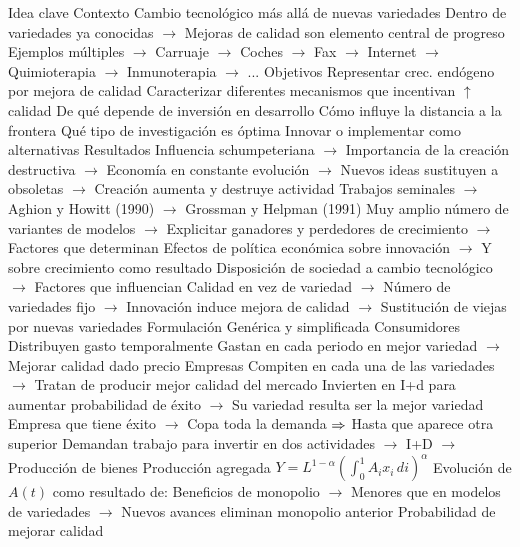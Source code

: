 \documentclass{nuevotema}
\begin{document}
\begin{esquemal}
			\3 Idea clave
				\4 Contexto
				\4[] Cambio tecnológico más allá de nuevas variedades
				\4[] Dentro de variedades ya conocidas
				\4[] $\to$ Mejoras de calidad son elemento central de progreso
				\4[] Ejemplos múltiples
				\4[] $\to$ Carruaje $\to$ Coches
				\4[] $\to$ Fax $\to$ Internet
				\4[] $\to$ Quimioterapia $\to$ Inmunoterapia
				\4[] $\to$ ...
				\4 Objetivos
				\4[] Representar crec. endógeno por mejora de calidad
				\4[] Caracterizar diferentes mecanismos que incentivan $\uparrow$ calidad
				\4[] De qué depende de inversión en desarrollo
				\4[] Cómo influye la distancia a la frontera
				\4[] Qué tipo de investigación es óptima
				\4[] Innovar o implementar como alternativas
				\4 Resultados
				\4[] Influencia schumpeteriana
				\4[] $\to$ Importancia de la creación destructiva
				\4[] $\to$ Economía en constante evolución
				\4[] $\to$ Nuevos ideas sustituyen a obsoletas
				\4[] $\to$ Creación aumenta y destruye actividad
				\4[] Trabajos seminales
				\4[] $\to$ Aghion y Howitt (1990)
				\4[] $\to$ Grossman y Helpman (1991)
				\4[] Muy amplio número de variantes de modelos
				\4[] $\to$ Explicitar ganadores y perdedores de crecimiento
				\4[] $\to$ Factores que determinan
				\4[] Efectos de política económica sobre innovación
				\4[] $\to$ Y sobre crecimiento como resultado
				\4[] Disposición de sociedad a cambio tecnológico
				\4[] $\to$ Factores que influencian
				\4[] Calidad en vez de variedad
				\4[] $\to$ Número de variedades fijo
				\4[] $\to$ Innovación induce mejora de calidad
				\4[] $\to$ Sustitución de viejas por nuevas variedades
			\3 Formulación
				\4 Genérica y simplificada
				\4 Consumidores
				\4[] Distribuyen gasto temporalmente
				\4[] Gastan en cada periodo en mejor variedad
				\4[] $\to$ Mejorar calidad dado precio
				\4 Empresas
				\4[] Compiten en cada una de las variedades
				\4[] $\to$ Tratan de producir mejor calidad del mercado
				\4[] Invierten en I+d para aumentar probabilidad de éxito
				\4[] $\to$ Su variedad resulta ser la mejor variedad
				\4[] Empresa que tiene éxito
				\4[] $\to$ Copa toda la demanda
				\4[] $\Rightarrow$ Hasta que aparece otra superior
				\4[] Demandan trabajo para invertir en dos actividades
				\4[] $\to$ I+D
				\4[] $\to$ Producción de bienes
				\4 Producción agregada
				\4[] $Y = L^{1-\alpha} \left( \int_0^1 A_i x_i \, di \right)^\alpha$
				\4 Evolución de $A(t)$ como resultado de:
				\4[] Beneficios de monopolio
				\4[] $\to$ Menores que en modelos de variedades
				\4[] $\to$ Nuevos avances eliminan monopolio anterior
				\4[] Probabilidad de mejorar calidad

\end{esquemal}
\end{document}
